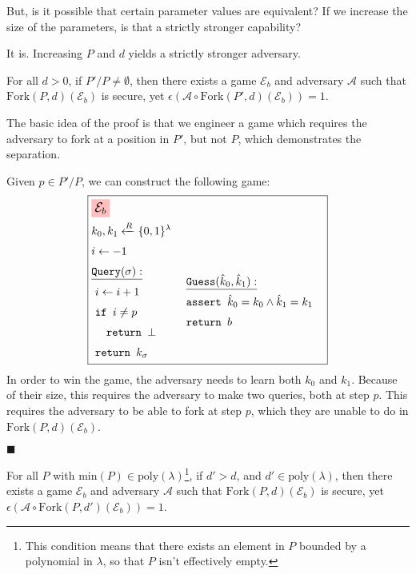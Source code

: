 But, is it possible that certain parameter values are equivalent?
If we increase the size of the parameters, is that a strictly stronger
capability?

It is.
Increasing $P$ and $d$ yields a strictly stronger adversary.

\begin{claim}
    \label{claim:P-is-stronger}
    For all $d > 0$, if $P' / P \neq \emptyset$, then there exists a
    game $\mathcal{E}_b$ and adversary $\mathcal{A}$ such that 
    $\text{Fork}(P, d)(\mathcal{E}_b)$ is secure, yet $\epsilon(\mathcal{A} \circ \text{Fork}(P', d)(\mathcal{E}_b)) = 1$.
\end{claim}

The basic idea of the proof is that we engineer a game which requires
the adversary to fork at a position in $P'$, but not $P$, which demonstrates
the separation.

Given $p \in P' / P$, we can construct the following game:
$$
\boxed{
\begin{aligned}
&\colorbox{pink}{\large $\mathcal{E}_b$}\cr
&k_0, k_1 \xleftarrow{R} \{0, 1\}^\lambda\cr
&i \gets -1\cr
&\begin{aligned}
    &\underline{\texttt{Query}(\sigma):}\cr
    &\ i \gets i + 1\cr
    &\ \texttt{if } i \neq p\cr
    &\ \quad \texttt{return } \bot\cr
    &\ \texttt{return } k_\sigma\cr
\end{aligned}
&\begin{aligned}
    &\ \underline{\texttt{Guess}(\hat{k}_0, \hat{k}_1):}\cr
    &\ \texttt{assert } \hat{k}_0 = k_0 \land \hat{k}_1 = k_1\cr
    &\ \texttt{return } b\cr
    &\cr
\end{aligned}\cr
\end{aligned}
}
$$
In order to win the game, the adversary needs to learn both $k_0$
and $k_1$.
Because of their size, this requires the adversary to make two
queries, both at step $p$.
This requires the adversary to be able to fork at step $p$,
which they are unable to do in $\text{Fork}(P, d)(\mathcal{E}_b)$.

$\blacksquare$

\begin{claim}
    \label{claim:d-is-stronger}
    For all $P$ with $\text{min}(P) \in \text{poly}(\lambda)$\footnote{This condition means that there exists an element in $P$ bounded by a polynomial in $\lambda$, so that $P$ isn't effectively empty.},
    if $d' > d$, and ${d' \in \text{poly}(\lambda)}$, then there exists a
    game $\mathcal{E}_b$ and adversary $\mathcal{A}$ such that 
    $\text{Fork}(P, d)(\mathcal{E}_b)$ is secure, yet ${\epsilon(\mathcal{A} \circ \text{Fork}(P, d')(\mathcal{E}_b)) = 1}$.
\end{claim}

